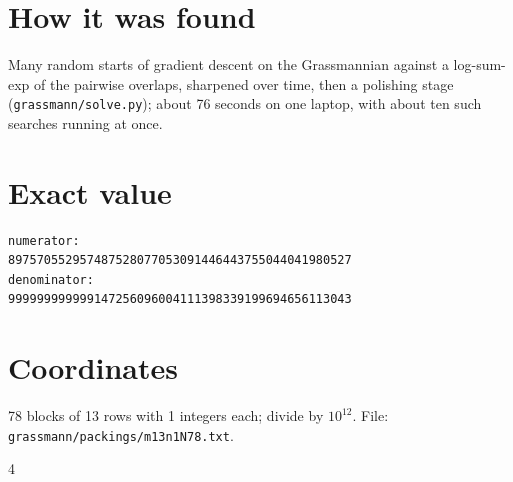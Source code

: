 \documentclass[11pt,a4paper]{article}
\begin{document}
\section{How it was found}
Many random starts of gradient descent on the Grassmannian against a log-sum-exp of the pairwise overlaps, sharpened over time, then a polishing stage (\texttt{grassmann/solve.py}); about 76 seconds on one laptop, with about ten such searches running at once.


\appendix
\section{Exact value}
{\small
\begin{verbatim}
numerator:
897570552957487528077053091446443755044041980527
denominator:
999999999999147256096004111398339199694656113043
\end{verbatim}}

\section{Coordinates}
78 blocks of 13 rows with 1 integers each; divide by $10^{12}$. File: \texttt{grassmann/packings/m13n1N78.txt}.
{\tiny
\begin{multicols}{4}
\end{multicols}}
\end{document}

